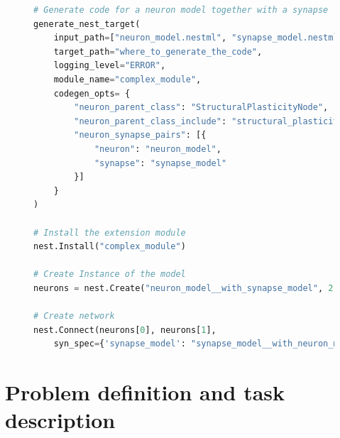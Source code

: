 \vspace{0.5em}
\begin{figure}[ht!]
\centering
\begin{lstlisting}[language=Python, label=lst:nestml_with_synapse, caption={The \texttt{generate\_nest\_target()} function generates code for the neuron and synapse together. The \texttt{input\_path} takes a list of NESTML files with the first being the neuron model, the second the synapse model. The library will be generated with the name \emph{complex\_module}. In contrast to the simple case in \autoref{lst:nestml_without_synapse}, co-generating the code for the neuron and synapse requires the user to provide the relation between the neuron and the synapse in the \texttt{codegen\_opts} dictionary. Installing the new library is not different from the previous case, we simply call the \texttt{Install()} function with \emph{complex\_module} as the library name. The main difference is in the creation of model instances. The neuron model is no longer registered in NEST under the name \emph{"neuron\_model}, but the neuron name is now the concatenation of the neuron name and the synapse name to express the relation between the two. The same name mangling is applied for the synapse models, which becomes available under the name \emph{synapse\_model\_\_with\_neuron\_model}. These name changes have to be manually tracked by the user when calling \texttt{Create()} and \texttt{Connect()}.}, captionpos=b]
# Generate code for a neuron model together with a synapse
generate_nest_target(
    input_path=["neuron_model.nestml", "synapse_model.nestml"],
    target_path="where_to_generate_the_code",
    logging_level="ERROR",
    module_name="complex_module",
    codegen_opts= {
        "neuron_parent_class": "StructuralPlasticityNode",
        "neuron_parent_class_include": "structural_plasticity_node.h",
        "neuron_synapse_pairs": [{
            "neuron": "neuron_model",
            "synapse": "synapse_model"
        }]
    }
)

# Install the extension module
nest.Install("complex_module")

# Create Instance of the model
neurons = nest.Create("neuron_model__with_synapse_model", 2)

# Create network
nest.Connect(neurons[0], neurons[1],
    syn_spec={'synapse_model': "synapse_model__with_neuron_model"})
\end{lstlisting}
\end{figure}

\section{Problem definition and task description}

